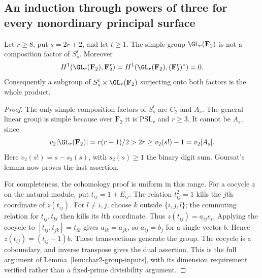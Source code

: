 \subsection{An induction through powers of three for every nonordinary principal surface}

\begin{lemma}
\label{lem:RD-A4-three-power-groups}
Let $r\ge8$, put $s=2r+2$, and let $t\ge1$.
The simple group $\GL_r(\mathbf F_2)$ is not a composition factor
of $S_s^t$.  Moreover
\[
 H^1(\GL_r(\mathbf F_2),\mathbf F_2^r)
 =H^1(\GL_r(\mathbf F_2),(\mathbf F_2^r)^*)=0.
\]
Consequently a subgroup of $S_s^t\times\GL_r(\mathbf F_2)$
surjecting onto both factors is the whole product.
\end{lemma}
\begin{proof}
The only simple composition factors of $S_s^t$ are $C_2$ and
$A_s$.  The general linear group is simple because over $\mathbf F_2$
it is $\mathrm{PSL}_r$ and $r\ge3$.  It cannot be $A_s$, since
\[
 v_2|\GL_r(\mathbf F_2)|=r(r-1)/2>2r
       \ge v_2(s!)-1=v_2|A_s|.
\]
Here $v_2(s!)=s-s_2(s)$, with $s_2(s)\ge1$ the binary digit sum.
Goursat's lemma now proves the last assertion.

For completeness, the cohomology proof is uniform in this range.
For a cocycle $z$ on the natural module, put $t_{ij}=1+E_{ij}$.
The relation $t_{ij}^2=1$ kills the $j$th coordinate of $z(t_{ij})$.
For $l\ne i,j$, choose $k$ outside $\{i,j,l\}$; the commuting
relation for $t_{ij},t_{kl}$ then kills its $l$th coordinate.
Thus $z(t_{ij})=a_{ij}e_i$.  Applying the cocycle to
$[t_{ij},t_{jk}]=t_{ik}$ gives $a_{ik}=a_{jk}$, so $a_{ij}=b_j$
for a single vector $b$.  Hence $z(t_{ij})=(t_{ij}-1)b$.
These transvections generate the group.  The cocycle is a
coboundary, and inverse transpose gives the dual assertion.
This is the full argument of Lemma~\ref{lem:char2-group-inputs},
with its dimension requirement verified rather than a fixed-prime
divisibility argument.
\end{proof}

